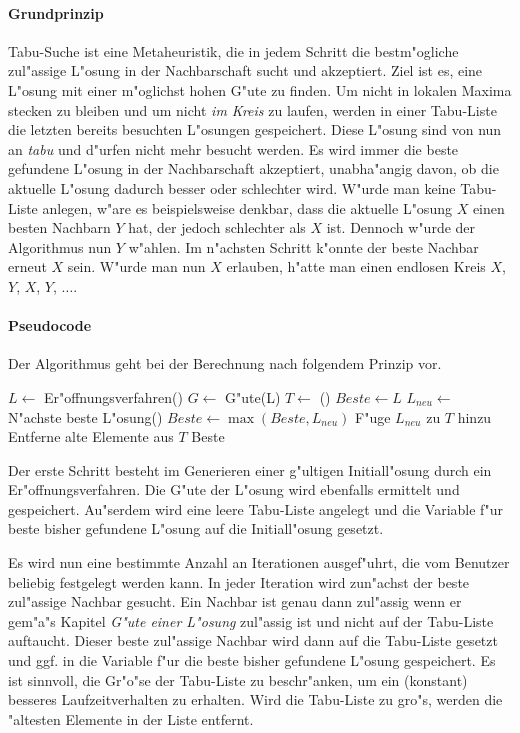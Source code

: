 \paragraph{Grundprinzip}
Tabu-Suche ist eine Metaheuristik, die in jedem Schritt die bestm"ogliche zul"assige L"osung in der Nachbarschaft sucht und akzeptiert. Ziel ist es, eine L"osung mit einer m"oglichst hohen G"ute zu finden. Um nicht in lokalen Maxima stecken zu bleiben und um nicht \emph{im Kreis} zu laufen, werden in einer Tabu-Liste die letzten bereits besuchten L"osungen gespeichert. Diese L"osung sind von nun an \emph{tabu} und d"urfen nicht mehr besucht werden. Es wird immer die beste gefundene L"osung in der Nachbarschaft akzeptiert, unabha"angig davon, ob die aktuelle L"osung dadurch besser oder schlechter wird. W"urde man keine Tabu-Liste anlegen, w"are es beispielsweise denkbar, dass die aktuelle L"osung \(X\) einen besten Nachbarn \(Y\) hat, der jedoch schlechter als \(X\) ist. Dennoch w"urde der Algorithmus nun \(Y\) w"ahlen. Im n"achsten Schritt k"onnte der beste Nachbar erneut \(X\) sein. W"urde man nun \(X\) erlauben, h"atte man einen endlosen Kreis \(X\), \(Y\), \(X\), \(Y\), \(\ldots\). 

\paragraph{Pseudocode}
Der Algorithmus geht bei der Berechnung nach folgendem Prinzip vor.

\begin{algorithmic}
\STATE $L \gets$ Er"offnungsverfahren()
\STATE $G \gets$ G"ute(L)
\STATE $T \gets$ ()
\STATE $Beste \gets L$
\newline
{}
	\REPEAT
		\STATE $L_{neu} \gets$ N"achste beste L"osung()
	\newline
	\STATE $Beste \gets \max(Beste, L_{neu})$
	\STATE F"uge $L_{neu}$ zu $T$ hinzu
	\STATE Entferne alte Elemente aus $T$
\ENDFOR
\RETURN Beste
\end{algorithmic}
Der erste Schritt besteht im Generieren einer g"ultigen Initiall"osung durch ein Er"offnungsverfahren. Die G"ute der L"osung wird ebenfalls ermittelt und gespeichert. Au"serdem wird eine leere Tabu-Liste angelegt und die Variable f"ur beste bisher gefundene L"osung auf die Initiall"osung gesetzt.

Es wird nun eine bestimmte Anzahl an Iterationen ausgef"uhrt, die vom Benutzer beliebig festgelegt werden kann. In jeder Iteration wird zun"achst der beste zul"assige Nachbar gesucht. Ein Nachbar ist genau dann zul"assig wenn er gem"a"s Kapitel \emph{G"ute einer L"osung} zul"assig ist und nicht auf der Tabu-Liste auftaucht. Dieser beste zul"assige Nachbar wird dann auf die Tabu-Liste gesetzt und ggf. in die Variable f"ur die beste bisher gefundene L"osung gespeichert. Es ist sinnvoll, die Gr"o"se der Tabu-Liste zu beschr"anken, um ein (konstant) besseres Laufzeitverhalten zu erhalten. Wird die Tabu-Liste zu gro"s, werden die "altesten Elemente in der Liste entfernt. 

